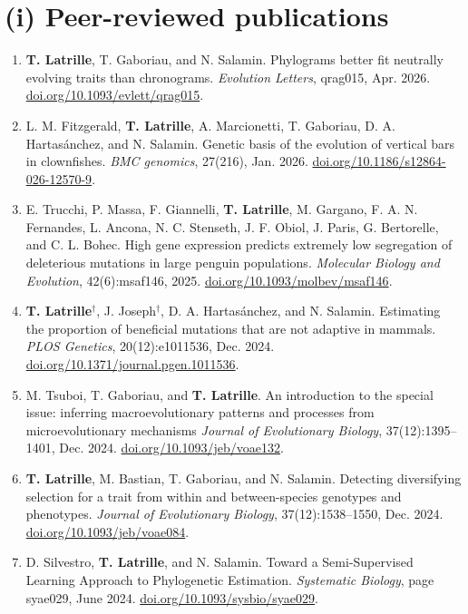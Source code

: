 \documentclass[11pt,a4paper]{moderncv}
\begin{document}
\section*{(i) Peer-reviewed publications}
\begin{enumerate}
\setlength\itemsep{1em}
    \item \textbf{T. Latrille}, T. Gaboriau, and N. Salamin. Phylograms better fit neutrally evolving traits than chronograms. \textit{Evolution Letters}, qrag015, Apr. 2026. \href{https://doi.org/10.1093/evlett/qrag015}{doi.org/10.1093/evlett/qrag015}.
    \item L. M. Fitzgerald, \textbf{T. Latrille}, A. Marcionetti, T. Gaboriau, D. A. Hartasánchez, and N. Salamin. Genetic basis of the evolution of vertical bars in clownfishes. \textit{BMC genomics}, 27(216), Jan. 2026. \href{https://doi.org/10.1186/s12864-026-12570-9}{doi.org/10.1186/s12864-026-12570-9}.
    \item E. Trucchi, P. Massa, F. Giannelli, \textbf{T. Latrille}, M. Gargano, F. A. N. Fernandes, L. Ancona, N. C. Stenseth, J. F. Obiol, J. Paris, G. Bertorelle, and C. L. Bohec. High gene expression predicts extremely low segregation of deleterious mutations in large penguin populations. \textit{Molecular Biology and Evolution}, 42(6):msaf146, 2025. \href{https://doi.org/10.1093/molbev/msaf146}{doi.org/10.1093/molbev/msaf146}.
    \item \textbf{T. Latrille}$^{\dag}$, J. Joseph$^{\dag}$, D. A. Hartasánchez, and N. Salamin. Estimating the proportion of beneficial mutations that are not adaptive in mammals. \textit{PLOS Genetics}, 20(12):e1011536, Dec. 2024. \href{https://doi.org/10.1371/journal.pgen.1011536}{doi.org/10.1371/journal.pgen.1011536}.
    \item M. Tsuboi, T. Gaboriau, and \textbf{T. Latrille}. An introduction to the special issue: inferring macroevolutionary patterns and processes from microevolutionary mechanisms \textit{Journal of Evolutionary Biology}, 37(12):1395–1401, Dec. 2024. \href{https://doi.org/10.1093/jeb/voae132}{doi.org/10.1093/jeb/voae132}.
    \item \textbf{T. Latrille}, M. Bastian, T. Gaboriau, and N. Salamin. Detecting diversifying selection for a trait from within and between-species genotypes and phenotypes. \textit{Journal of Evolutionary Biology}, 37(12):1538–1550, Dec. 2024. \href{https://doi.org/10.1093/jeb/voae084}{doi.org/10.1093/jeb/voae084}.
    \item D. Silvestro, \textbf{T. Latrille}, and N. Salamin. Toward a Semi-Supervised Learning Approach to Phylogenetic Estimation. \textit{Systematic Biology}, page syae029, June 2024. \href{https://doi.org/10.1093/sysbio/syae029}{doi.org/10.1093/sysbio/syae029}.

\end{enumerate}
\end{document}
